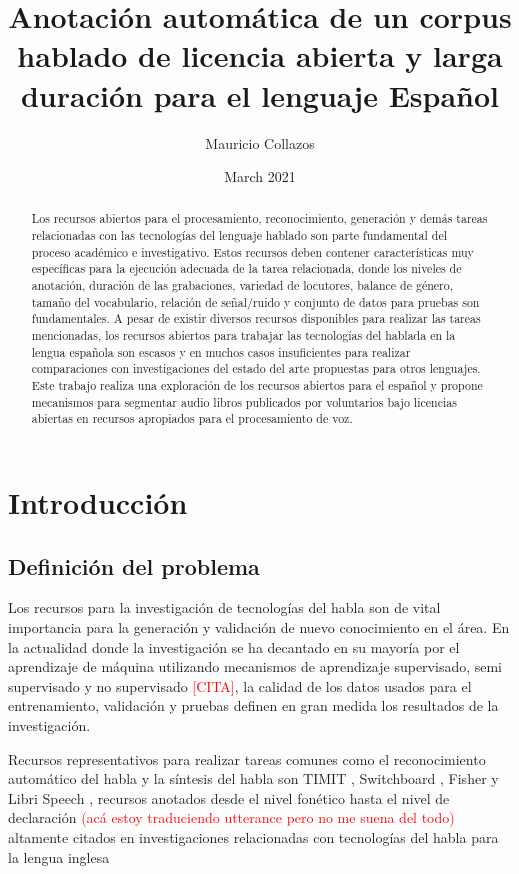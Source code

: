 \documentclass[a4paper,12pt,twoside]{report}
\title{Anotación automática de un corpus hablado de licencia abierta y larga duración para el lenguaje Español}
\author{Mauricio Collazos}
\date{March 2021}
\begin{document}
\maketitle

\begin{abstract}
    Los recursos abiertos para el procesamiento, reconocimiento, generación y demás tareas relacionadas con las tecnologías del lenguaje hablado son parte fundamental del proceso académico e investigativo. Estos recursos deben contener características muy específicas para la ejecución adecuada de la tarea relacionada, donde los niveles de anotación, duración de las grabaciones, variedad de locutores, balance de género, tamaño del vocabulario, relación de señal/ruido y conjunto de datos para pruebas son fundamentales. A pesar de existir diversos recursos disponibles para realizar las tareas mencionadas, los recursos abiertos para trabajar las tecnologías del hablada en la lengua española son escasos y en muchos casos insuficientes para realizar comparaciones con investigaciones del estado del arte propuestas para otros lenguajes. Este trabajo realiza una exploración de los recursos abiertos para el español y propone mecanismos para segmentar audio libros publicados por voluntarios bajo licencias abiertas en recursos apropiados para el procesamiento de voz.
\end{abstract}


\chapter{Introducción}

\section{Definición del problema}

Los recursos para la investigación de tecnologías del habla son de vital importancia para la generación y validación de nuevo conocimiento en el área. En la actualidad donde la investigación se ha decantado en su mayoría por el aprendizaje de máquina utilizando mecanismos de aprendizaje supervisado, semi supervisado y no supervisado \textcolor{red}{[CITA]}, la calidad de los datos usados para el entrenamiento, validación y pruebas definen en gran medida los resultados de la investigación.

Recursos representativos para realizar tareas comunes como el reconocimiento automático del habla y la síntesis del habla son TIMIT \cite{PriceTheRecognition}, Switchboard \cite{Godfrey1992SWITCHBOARD:Development}, Fisher \cite{CieriTheSpeech-to-Text} y Libri Speech \cite{PanayotovLIBRISPEECH:BOOKS}, recursos anotados desde el nivel fonético hasta el nivel de declaración \textcolor{red}{(acá estoy traduciendo utterance pero no me suena del todo)} altamente citados en investigaciones relacionadas con tecnologías del habla para la lengua inglesa
\end{document}
